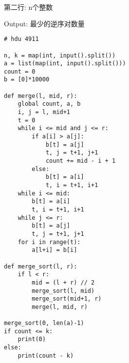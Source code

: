 \documentclass[../main]{subfiles}
\begin{document}
\begin{sloppy}
第二行: n个整数

Output: 最少的逆序对数量

\begin{lstlisting}[style = Python]
# hdu 4911

n, k = map(int, input().split())
a = list(map(int, input().split()))
count = 0
b = [0]*10000

def merge(l, mid, r):
    global count, a, b
    i, j = l, mid+1
    t = 0
    while i <= mid and j <= r:
        if a[i] > a[j]:
            b[t] = a[j]
            t, j = t+1, j+1
            count += mid - i + 1
        else:
            b[t] = a[i]
            t, i = t+1, i+1
    while i <= mid:
        b[t] = a[i]
        t, i = t+1, i+1
    while j <= r:
        b[t] = a[j]
        t, j = t+1, j+1
    for i in range(t):
        a[l+i] = b[i]

def merge_sort(l, r):
    if l < r:
        mid = (l + r) // 2
        merge_sort(l, mid)
        merge_sort(mid+1, r)
        merge(l, mid, r)

merge_sort(0, len(a)-1)
if count <= k:
    print(0)
else:
    print(count - k)
\end{lstlisting}



\end{sloppy}
\end{document}
